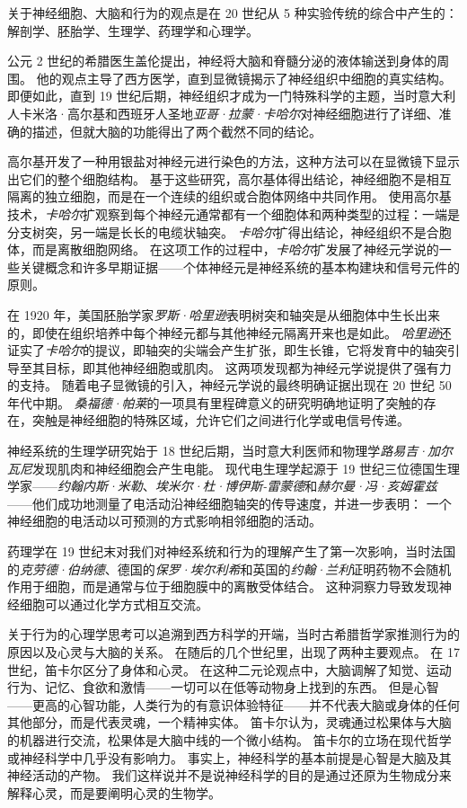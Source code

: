 关于神经细胞、大脑和行为的观点是在 20 世纪从 5 种实验传统的综合中产生的：解剖学、胚胎学、生理学、药理学和心理学。


公元 2 世纪的希腊医生盖伦提出，神经将大脑和脊髓分泌的液体输送到身体的周围。
他的观点主导了西方医学，直到显微镜揭示了神经组织中细胞的真实结构。
即便如此，直到 19 世纪后期，神经组织才成为一门特殊科学的主题，当时意大利人卡米洛·高尔基和西班牙人圣地\textit{亚哥·拉蒙·卡哈尔}对神经细胞进行了详细、准确的描述，但就大脑的功能得出了两个截然不同的结论。


高尔基开发了一种用银盐对神经元进行染色的方法，这种方法可以在显微镜下显示出它们的整个细胞结构。
基于这些研究，高尔基体得出结论，神经细胞不是相互隔离的独立细胞，而是在一个连续的组织或合胞体网络中共同作用。
使用高尔基技术，\textit{卡哈尔}扩观察到每个神经元通常都有一个细胞体和两种类型的过程：一端是分支树突，另一端是长长的电缆状轴突。 
\textit{卡哈尔}扩得出结论，神经组织不是合胞体，而是离散细胞网络。
在这项工作的过程中，\textit{卡哈尔}扩发展了神经元学说的一些关键概念和许多早期证据——个体神经元是神经系统的基本构建块和信号元件的原则。


在 1920 年，美国胚胎学家\textit{罗斯·哈里逊}表明树突和轴突是从细胞体中生长出来的，即使在组织培养中每个神经元都与其他神经元隔离开来也是如此。
\textit{哈里逊}还证实了\textit{卡哈尔}的提议，即轴突的尖端会产生扩张，即生长锥，它将发育中的轴突引导至其目标，即其他神经细胞或肌肉。
这两项发现都为神经元学说提供了强有力的支持。
随着电子显微镜的引入，神经元学说的最终明确证据出现在 20 世纪 50 年代中期。
\textit{桑福德·帕莱}的一项具有里程碑意义的研究明确地证明了突触的存在，突触是神经细胞的特殊区域，允许它们之间进行化学或电信号传递。


神经系统的生理学研究始于 18 世纪后期，当时意大利医师和物理学\textit{路易吉·加尔瓦尼}发现肌肉和神经细胞会产生电能。
现代电生理学起源于 19 世纪三位德国生理学家——\textit{约翰内斯·米勒}、\textit{埃米尔·杜·博伊斯-雷蒙德}和\textit{赫尔曼·冯·亥姆霍兹}——他们成功地测量了电活动沿神经细胞轴突的传导速度，并进一步表明：
一个神经细胞的电活动以可预测的方式影响相邻细胞的活动。


药理学在 19 世纪末对我们对神经系统和行为的理解产生了第一次影响，当时法国的\textit{克劳德·伯纳德}、德国的\textit{保罗·埃尔利希}和英国的\textit{约翰·兰利}证明药物不会随机作用于细胞，而是通常与位于细胞膜中的离散受体结合。 
这种洞察力导致发现神经细胞可以通过化学方式相互交流。


关于行为的心理学思考可以追溯到西方科学的开端，当时古希腊哲学家推测行为的原因以及心灵与大脑的关系。
在随后的几个世纪里，出现了两种主要观点。
在 17 世纪，笛卡尔区分了身体和心灵。
在这种二元论观点中，大脑调解了知觉、运动行为、记忆、食欲和激情——一切可以在低等动物身上找到的东西。
但是心智——更高的心智功能，人类行为的有意识体验特征——并不代表大脑或身体的任何其他部分，而是代表灵魂，一个精神实体。
笛卡尔认为，灵魂通过松果体与大脑的机器进行交流，松果体是大脑中线的一个微小结构。
笛卡尔的立场在现代哲学或神经科学中几乎没有影响力。 
事实上，神经科学的基本前提是心智是大脑及其神经活动的产物。
我们这样说并不是说神经科学的目的是通过还原为生物成分来解释心灵，而是要阐明心灵的生物学。


